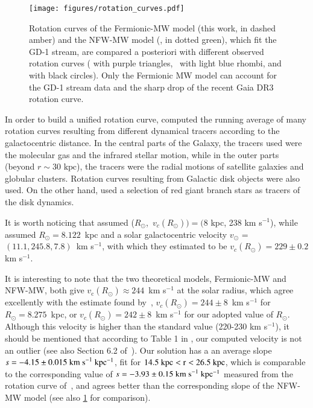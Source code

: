 \documentclass[twocolumn]{aa}
\begin{document}
\begin{figure}
   \centering
   \texttt{[image: figures/rotation\_curves.pdf]}
   \caption{Rotation curves of the Fermionic-MW model (this work, in dashed amber) and the NFW-MW model (\cite{2019MNRAS.486.2995M}, in dotted green), which fit the GD-1 stream, are compared a posteriori with different observed rotation curves (\citealp{Eilers_2019} with purple triangles,~\citealp{sofue_2020} with light blue rhombi, and \citealp{Jiao2023} with black circles). Only the Fermionic MW model can account for the GD-1 stream data and the sharp drop of the recent Gaia DR3 rotation curve.}
   \label{fig:rotcurve}
\end{figure}


In order to build a unified rotation curve, \citet{sofue_2020} computed the running average of many rotation curves resulting from different dynamical tracers according to the galactocentric distance. In the central parts of the Galaxy, the tracers used were the molecular gas and the infrared stellar motion, while in the outer parts (beyond $r\sim30 \textrm{~kpc}$), the tracers were the radial motions of satellite galaxies and globular clusters. Rotation curves resulting from Galactic disk objects were also used.
On the other hand, \citet{Eilers_2019} used a selection of red giant branch stars as tracers of the disk dynamics.

It is worth noticing  that \citet{sofue_2020} assumed
($R_\odot$,~$v_c(R_\odot))=(8$ kpc, 238 km s$^{-1}$), while \citet{Eilers_2019}
assumed $R_\odot=8.122$~kpc and a solar galactocentric velocity $v_\odot$ = $(11.1, 245.8, 7.8)$~km s$^{-1}$,
with which they estimated to be $v_c(R_\odot)=229\pm0.2$ km s$^{-1}$.

It is interesting to note that the two theoretical models, Fermionic-MW and NFW-MW, both give $v_\mathrm{c}(R_\odot)\approx 244$~km s$^{-1}$ at the solar radius, which agree excellently with the estimate found
by~\citet{2020arXiv201202169B}, $v_c(R_\odot)=244\pm 8$~km s$^{-1}$ for $R_\odot = 8.275$~kpc, or $v_c(R_\odot)=242\pm 8$~km s$^{-1}$ for our adopted value of $R_\odot$. Although this velocity is higher than the standard value (220-230 km s$^{-1}$), it should be mentioned
that according to Table 1 in \citet{sofue_2020}, our computed velocity is not an outlier (see also Section 6.2 of~\citealt{Honma_2012}).
Our solution has a an average slope $s=-4.15\pm0.015~\rm{km~s}^{-1}~kpc^{-1}$, fit for $14.5~\rm{kpc} < r < 26.5~\rm{kpc}$, which is
comparable to the corresponding value of $s=-3.93\pm0.15~\rm{km~s}^{-1}~kpc^{-1}$ measured from the rotation curve of~\citet{Jiao2023}, and agrees better than the corresponding slope of the NFW-MW model (see also \cref{fig:rotcurve} for comparison).
\end{document}
